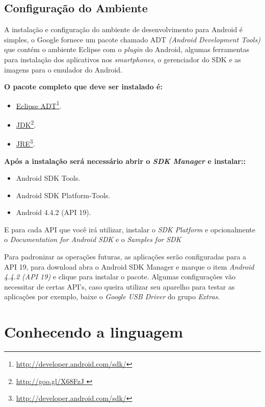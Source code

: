 \documentclass[a4paper,12pt,brazil,oneside]{book}
\begin{document}
\newpage

\section{Configuração do Ambiente}

A instalação e configuração do ambiente de desenvolvimento para Android é simples, o Google fornece um pacote chamado ADT \emph{(Android Development Tools)} que contém o ambiente Eclipse com o \emph{plugin} do Android, algumas ferramentas para instalação dos aplicativos nos \emph{smartphones}, o gerenciador do SDK e as imagens para o emulador do Android.

\singlespace

\textbf{O pacote completo que deve ser instalado é:}
\begin{itemize}
\item \href{http://developer.android.com/sdk/}{Eclipse ADT}\footnote{\href{http://developer.android.com/sdk/}{http://developer.android.com/sdk/}}.
\item \href{http://goo.gl/X68FzJ}{JDK}\footnote{\href{http://goo.gl/X68FzJ}{http://goo.gl/X68FzJ }}. 
\item \href{http://developer.android.com/sdk/}{JRE}\footnote{\href{http://developer.android.com/sdk/}{http://developer.android.com/sdk/}}. 
\end{itemize}

\textbf{Após a instalação será necessário abrir o \emph{SDK Manager} e instalar::}
\begin{itemize}
\item Android SDK Tools.
\item Android SDK Platform-Tools.
\item Android 4.4.2 (API 19).
\end{itemize}

\doublespace

E para cada API que você irá utilizar, instalar o \emph{SDK Platform} e opcionalmente o \emph{Documentation for Android SDK} e o \emph{Samples for SDK}

Para padronizar as operações futuras, as aplicações serão configuradas para a API 19, para download abra o Android SDK Manager e marque o item \emph{Android 4.4.2 (API 19)} e clique para instalar o pacote. Algumas configurações vão necessitar de certas API's, caso queira utilizar seu aparelho para testar as aplicações por exemplo, baixe o \emph{Google USB Driver} do grupo \emph{Extras}.

\chapter{Conhecendo a linguagem}
\end{document}
